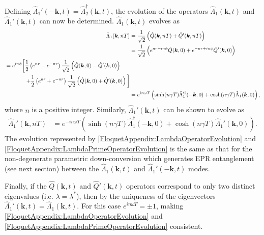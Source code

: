 Defining $\hat{\Lambda}_1'(-\bm{k}, t) = \hat{\Lambda}_2^\dagger(\bm{k}, t)$, the evolution of the operators $\hat{\Lambda}_1(\bm{k}, t)$ and $\hat{\Lambda}_1'(\bm{k}, t)$ can now be determined. $\hat{\Lambda}_1(\bm{k}, t)$ evolves as
\begin{align}
    \hat{\Lambda}_1(\bm{k}, nT) &= \frac{1}{\sqrt{2}} \left(\hat{Q}(\bm{k}, nT) + \hat{Q}'(\bm{k}, nT) \right) \\
        &= \frac{1}{\sqrt{2}} \left( e^{nr + i n\phi} \hat{Q}(\bm{k}, 0) + e^{-nr + i n \phi}\hat{Q}'(\bm{k}, 0)\right) \\
        \begin{split}
            &=  e^{i n \phi} \bigg[ \frac{1}{2}\left( e^{nr} - e^{-nr}\right)\frac{1}{\sqrt{2}}\left(\hat{Q}(\bm{k}, 0) - \hat{Q}'(\bm{k}, 0) \right) \\
            &\relphantom{=e^{i n \phi}\bigg[} + \frac{1}{2} \left( e^{nr} + e^{-nr}\right)\frac{1}{\sqrt{2}} \left( \hat{Q}(\bm{k}, 0) + \hat{Q}'(\bm{k}, 0)\right)\bigg]
        \end{split}\\
        &= e^{i n \omega T} \left( \sinh(n\gamma T) \hat{\Lambda}_1'^\dagger(-\bm{k}, 0) + \cosh(n \gamma T) \hat{\Lambda}_1(\bm{k}, 0)\right), \label{FloquetAppendix:LambdaOperatorEvolution}
\end{align}
where $n$ is a positive integer. Similarly, $\hat{\Lambda}_1'(\bm{k}, t)$ can be shown to evolve as
\begin{align}
    \hat{\Lambda}_1'(\bm{k}, nT) &= e^{-i n \omega T} \left( \sinh(n \gamma T) \hat{\Lambda}_1^\dagger(-\bm{k}, 0) + \cosh(n \gamma T) \hat{\Lambda}_1'(\bm{k}, 0)\right). \label{FloquetAppendix:LambdaPrimeOperatorEvolution}
\end{align}
The evolution represented by \eqref{FloquetAppendix:LambdaOperatorEvolution} and \eqref{FloquetAppendix:LambdaPrimeOperatorEvolution} is the same as that for the non-degenerate parametric down-conversion \citep{WallsMilburn} which generates EPR entanglement (see next section) between the $\hat{\Lambda}_1(\bm{k}, t)$ and $\hat{\Lambda}_1'(-\bm{k}, t)$ modes.

Finally, if the $\hat{Q}(\bm{k}, t)$ and $\hat{Q}'(\bm{k}, t)$ operators correspond to only two distinct eigenvalues (i.e. $\lambda = \lambda^*$), then by the uniqueness of the eigenvectors $\hat{\Lambda}_1'(\bm{k}, t) = \hat{\Lambda}_1(\bm{k}, t)$. For this case $\displaystyle e^{i n\omega T} = \pm 1$, making \eqref{FloquetAppendix:LambdaOperatorEvolution} and \eqref{FloquetAppendix:LambdaPrimeOperatorEvolution} consistent.

